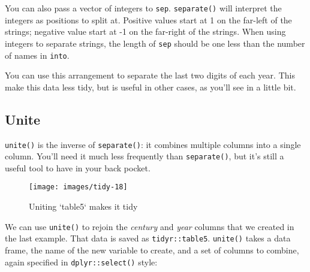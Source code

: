\documentclass[]{book}
\newenvironment{Shaded}{\begin{snugshade}}{\end{snugshade}}
\newcommand{\KeywordTok}[1]{\textcolor[rgb]{0.13,0.29,0.53}{\textbf{{#1}}}}
\newcommand{\DataTypeTok}[1]{\textcolor[rgb]{0.13,0.29,0.53}{{#1}}}
\newcommand{\DecValTok}[1]{\textcolor[rgb]{0.00,0.00,0.81}{{#1}}}
\newcommand{\StringTok}[1]{\textcolor[rgb]{0.31,0.60,0.02}{{#1}}}
\newcommand{\CommentTok}[1]{\textcolor[rgb]{0.56,0.35,0.01}{\textit{{#1}}}}
\newcommand{\NormalTok}[1]{{#1}}
\begin{document}
You can also pass a vector of integers to \texttt{sep}.
\texttt{separate()} will interpret the integers as positions to split
at. Positive values start at 1 on the far-left of the strings; negative
value start at -1 on the far-right of the strings. When using integers
to separate strings, the length of \texttt{sep} should be one less than
the number of names in \texttt{into}.

You can use this arrangement to separate the last two digits of each
year. This make this data less tidy, but is useful in other cases, as
you'll see in a little bit.

\begin{Shaded}
\end{Shaded}

\subsection{Unite}\label{unite}

\texttt{unite()} is the inverse of \texttt{separate()}: it combines
multiple columns into a single column. You'll need it much less
frequently than \texttt{separate()}, but it's still a useful tool to
have in your back pocket.

\begin{figure}

{\centering \texttt{[image: images/tidy-18]} 

}

\caption{Uniting `table5` makes it tidy}\label{fig:tidy-unite}
\end{figure}

We can use \texttt{unite()} to rejoin the \emph{century} and \emph{year}
columns that we created in the last example. That data is saved as
\texttt{tidyr::table5}. \texttt{unite()} takes a data frame, the name of
the new variable to create, and a set of columns to combine, again
specified in \texttt{dplyr::select()} style:
\end{document}

